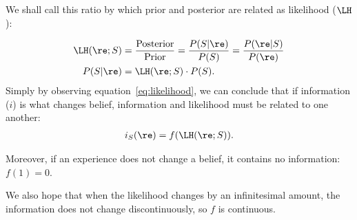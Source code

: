 We shall call this ratio by which prior and posterior are related as likelihood (\(\LH\)):

\begin{align}
	\LH(\re; S) &= \frac{\text{Posterior}}{\text{Prior}} = \frac{P(S | \re )}{P(S)} = \frac{P(\re | S )}{P(\re)} \label{eq:likelihood}\\
	P(S|\re ) &= \LH(\re; S)\cdot P(S).
 \end{align}
Simply by observing equation~\ref{eq:likelihood}, we can conclude that if information (\(i\)) is what changes belief, information and likelihood must be related to one another:
\begin{align}
	i_S(\re) = f(\LH(\re; S)).
\label{eq:information_as_function_of_likelihood} \end{align}

Moreover, if an experience does not change a belief, it contains no information: \(f(1)=0\).

We also hope that when the likelihood changes by an infinitesimal amount, the information does not change discontinuously, so \(f\) is continuous.

